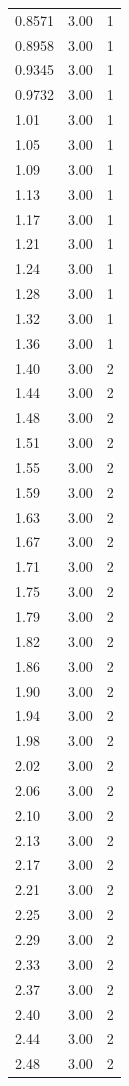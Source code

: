 \begin{longtable}{lrr}
  0.8571 & 3.00 & 1 \\
  0.8958 & 3.00 & 1 \\
  0.9345 & 3.00 & 1 \\
  0.9732 & 3.00 & 1 \\
  1.01 & 3.00 & 1 \\
  1.05 & 3.00 & 1 \\
  1.09 & 3.00 & 1 \\
  1.13 & 3.00 & 1 \\
  1.17 & 3.00 & 1 \\
  1.21 & 3.00 & 1 \\
  1.24 & 3.00 & 1 \\
  1.28 & 3.00 & 1 \\
  1.32 & 3.00 & 1 \\
  1.36 & 3.00 & 1 \\
  1.40 & 3.00 & 2 \\
  1.44 & 3.00 & 2 \\
  1.48 & 3.00 & 2 \\
  1.51 & 3.00 & 2 \\
  1.55 & 3.00 & 2 \\
  1.59 & 3.00 & 2 \\
  1.63 & 3.00 & 2 \\
  1.67 & 3.00 & 2 \\
  1.71 & 3.00 & 2 \\
  1.75 & 3.00 & 2 \\
  1.79 & 3.00 & 2 \\
  1.82 & 3.00 & 2 \\
  1.86 & 3.00 & 2 \\
  1.90 & 3.00 & 2 \\
  1.94 & 3.00 & 2 \\
  1.98 & 3.00 & 2 \\
  2.02 & 3.00 & 2 \\
  2.06 & 3.00 & 2 \\
  2.10 & 3.00 & 2 \\
  2.13 & 3.00 & 2 \\
  2.17 & 3.00 & 2 \\
  2.21 & 3.00 & 2 \\
  2.25 & 3.00 & 2 \\
  2.29 & 3.00 & 2 \\
  2.33 & 3.00 & 2 \\
  2.37 & 3.00 & 2 \\
  2.40 & 3.00 & 2 \\
  2.44 & 3.00 & 2 \\
  2.48 & 3.00 & 2 \\

\end{longtable}
